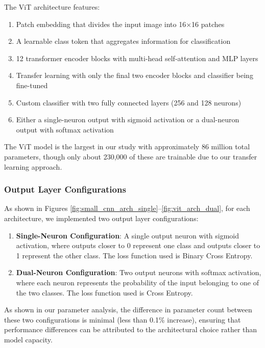 The ViT architecture features:
\begin{enumerate}
\item Patch embedding that divides the input image into 16×16 patches
\item A learnable class token that aggregates information for classification
\item 12 transformer encoder blocks with multi-head self-attention and MLP layers
\item Transfer learning with only the final two encoder blocks and classifier being fine-tuned
\item Custom classifier with two fully connected layers (256 and 128 neurons)
\item Either a single-neuron output with sigmoid activation or a dual-neuron output with softmax activation
\end{enumerate}

The ViT model is the largest in our study with approximately 86 million total parameters, though only about 230,000 of these are trainable due to our transfer learning approach.

\FloatBarrier
\subsubsection{Output Layer Configurations}

As shown in Figures \ref{fig:small_cnn_arch_single}--\ref{fig:vit_arch_dual}, for each architecture, we implemented two output layer configurations:

\begin{enumerate}
\item \textbf{Single-Neuron Configuration}: A single output neuron with sigmoid activation, where outputs closer to 0 represent one class and outputs closer to 1 represent the other class. The loss function used is Binary Cross Entropy.

\item \textbf{Dual-Neuron Configuration}: Two output neurons with softmax activation, where each neuron represents the probability of the input belonging to one of the two classes. The loss function used is Cross Entropy.
\end{enumerate}

As shown in our parameter analysis, the difference in parameter count between these two configurations is minimal (less than 0.1\% increase), ensuring that performance differences can be attributed to the architectural choice rather than model capacity.
